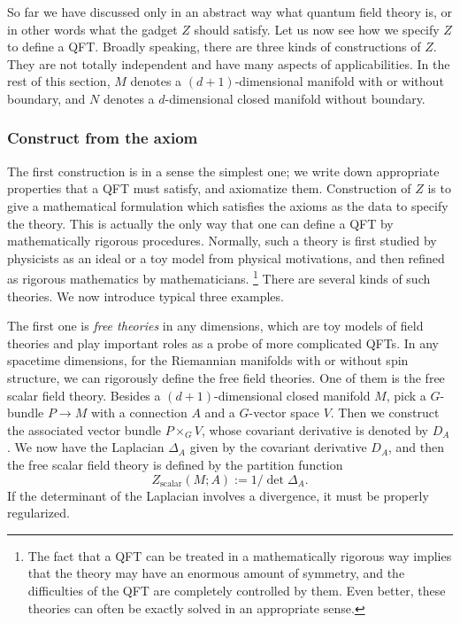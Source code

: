 So far we have discussed only in an abstract way what quantum field
theory is, or in other words what the gadget $Z$ should satisfy.
Let us now see how we specify $Z$ to define a QFT. Broadly speaking,
there are three kinds of constructions of $Z$. They are not totally
independent and have many aspects of applicabilities. In the rest
of this section, $M$ denotes a $(d+1)$-dimensional manifold with
or without boundary, and $N$ denotes a $d$-dimensional closed manifold
without boundary.

\subsubsection*{Construct from the axiom}

The first construction is in a sense the simplest one; we write down
appropriate properties that a QFT must satisfy, and axiomatize them.
Construction of $Z$ is to give a mathematical formulation which satisfies
the axioms as the data to specify the theory. This is actually the
only way that one can define a QFT by mathematically rigorous procedures.
Normally, such a theory is first studied by physicists as an ideal
or a toy model from physical motivations, and then refined as rigorous
mathematics by mathematicians.%
%
\footnote{The fact that a QFT can be treated in a mathematically rigorous way
implies that the theory may have an enormous amount of symmetry, and
the difficulties of the QFT are completely controlled by them. Even
better, these theories can often be exactly solved in an appropriate
sense.}
%
There are several kinds of such theories. We now introduce typical
three examples.

The first one is \emph{free theories} in any dimensions, which are
toy models of field theories and play important roles as a probe of
more complicated QFTs. In any spacetime dimensions, for the Riemannian
manifolds with or without spin structure, we can rigorously define
the free field theories. One of them is the free scalar field theory.
Besides a $(d+1)$-dimensional closed manifold $M$, pick a $G$-bundle
$P\to M$ with a connection $A$ and a $G$-vector space $V$.
Then we construct the associated vector bundle $P\times_{G}V$, whose
covariant derivative is denoted by $D_{A}$. We now have the Laplacian
$\Delta_{A}$ given by the covariant derivative $D_{A}$, and then
the free scalar field theory is defined by the partition function
\begin{equation}
  Z_{\mathrm{scalar}}(M;A)  :=  1/\det\Delta_{A}.
\end{equation}
If the determinant of the Laplacian involves a divergence, it must
be properly regularized.

